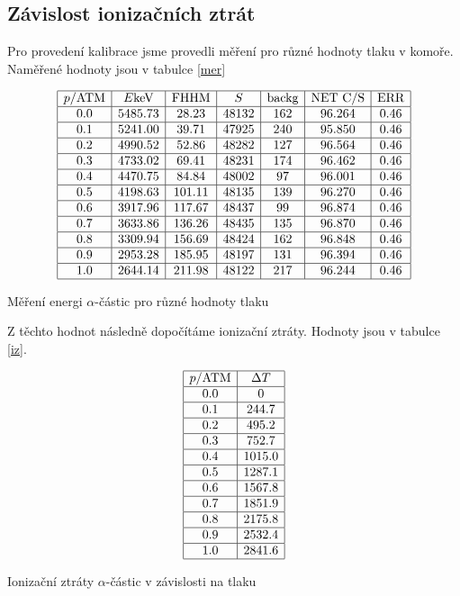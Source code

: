 \documentclass[a4paper,12pt]{article}
\begin{document}
\subsection{Závislost ionizačních ztrát}
Pro provedení kalibrace jsme provedli měření pro různé hodnoty tlaku v komoře. Naměřené hodnoty 
jsou v tabulce \ref{mer}

\begin{table}
$$
\begin{array}{|c|c|c|c|c|c|c|}
\hline
p/\mbox{ATM}&E\mbox{keV}&\mbox{FHHM}&S&\mbox{backg}&\mbox{NET C/S}& \mbox{ERR}\\ \hline
0.0&5485.73&28.23&48132&162&96.264&0.46\\ \hline
0.1&5241.00&39.71&47925&240&95.850&0.46\\ \hline
0.2&4990.52&52.86&48282&127&96.564&0.46\\ \hline
0.3&4733.02&69.41&48231&174&96.462&0.46\\ \hline
0.4&4470.75&84.84&48002&97&96.001&0.46\\ \hline
0.5&4198.63&101.11&48135&139&96.270&0.46\\ \hline
0.6&3917.96&117.67&48437&99&96.874&0.46\\ \hline
0.7&3633.86&136.26&48435&135&96.870&0.46\\ \hline
0.8&3309.94&156.69&48424&162&96.848&0.46\\ \hline
0.9&2953.28&185.95&48197&131&96.394&0.46\\ \hline
1.0&2644.14&211.98&48122&217&96.244&0.46\\ \hline
\end{array}
$$
\caption{Měření energi $\alpha$-částic pro různé hodnoty tlaku}
\label{mer}
\end{table}
Z těchto hodnot následně dopočítáme ionizační ztráty. Hodnoty jsou v tabulce \ref{iz}.

\begin{table}
$$
\begin{array}{|c|c|}
\hline
p/\mbox{ATM}& \Delta T \\ \hline
0.0&0\\ \hline
0.1&244.7\\ \hline
0.2&495.2\\ \hline
0.3&752.7\\ \hline
0.4&1015.0\\ \hline
0.5&1287.1\\ \hline
0.6&1567.8\\ \hline
0.7&1851.9\\ \hline
0.8&2175.8\\ \hline
0.9&2532.4\\ \hline
1.0&2841.6\\ \hline
\end{array}
$$
\caption{Ionizační ztráty $\alpha$-částic v závislosti na tlaku}
\label{iz}
\end{table}
\end{document}
